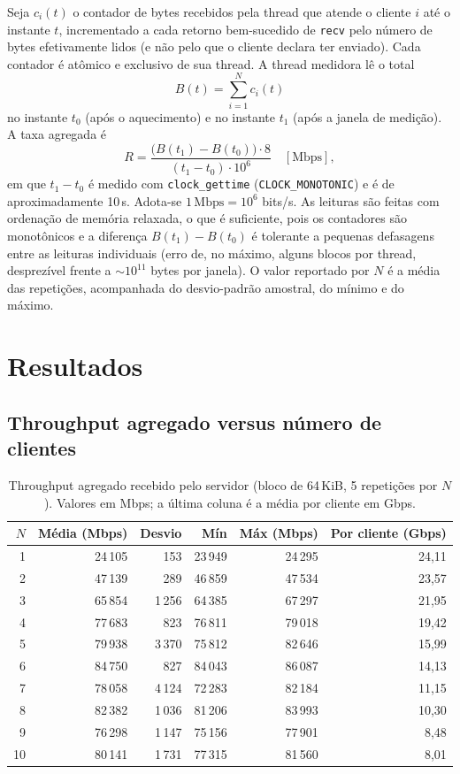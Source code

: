 \documentclass[12pt,a4paper]{article}
\newcommand{\SI}[2]{\mbox{#1\,#2}}
\begin{document}
Seja $c_i(t)$ o contador de bytes recebidos pela thread que atende o cliente
$i$ até o instante $t$, incrementado a cada retorno bem-sucedido de
\texttt{recv} pelo número de bytes efetivamente lidos (e não pelo que o cliente
declara ter enviado). Cada contador é atômico e exclusivo de sua thread. A
thread medidora lê o total
\begin{equation}
B(t)=\sum_{i=1}^{N} c_i(t)
\end{equation}
no instante $t_0$ (após o aquecimento) e no instante $t_1$ (após a janela de
medição). A taxa agregada é
\begin{equation}
R=\frac{\bigl(B(t_1)-B(t_0)\bigr)\cdot 8}{(t_1-t_0)\cdot 10^{6}}\quad[\text{Mbps}],
\end{equation}
em que $t_1-t_0$ é medido com \texttt{clock\_gettime}
(\texttt{CLOCK\_MONOTONIC}) e é de aproximadamente \SI{10}{s}. Adota-se
$1\,\text{Mbps}=10^{6}$ bits/s. As leituras são feitas com ordenação de
memória relaxada, o que é suficiente, pois os contadores são monotônicos e a
diferença $B(t_1)-B(t_0)$ é tolerante a pequenas defasagens entre as leituras
individuais (erro de, no máximo, alguns blocos por thread, desprezível frente
a $\sim\!10^{11}$ bytes por janela). O valor reportado por $N$ é a média das
repetições, acompanhada do desvio-padrão amostral, do mínimo e do máximo.

\section{Resultados}

\subsection{Throughput agregado versus número de clientes}

\begin{table}[H]
\centering
\caption{Throughput agregado recebido pelo servidor (bloco de \SI{64}{KiB},
5 repetições por $N$). Valores em Mbps; a última coluna é a média por cliente
em Gbps.}
\label{tab:main}
\begin{tabular}{rrrrrr}
\toprule
$N$ & Média (Mbps) & Desvio & Mín & \textbf{Máx (Mbps)} & Por cliente (Gbps)\\
\midrule
1  & 24\,105 & 153   & 23\,949 & 24\,295 & 24,11\\
2  & 47\,139 & 289   & 46\,859 & 47\,534 & 23,57\\
3  & 65\,854 & 1\,256 & 64\,385 & 67\,297 & 21,95\\
4  & 77\,683 & 823   & 76\,811 & 79\,018 & 19,42\\
5  & 79\,938 & 3\,370 & 75\,812 & 82\,646 & 15,99\\
6  & 84\,750 & 827   & 84\,043 & 86\,087 & 14,13\\
7  & 78\,058 & 4\,124 & 72\,283 & 82\,184 & 11,15\\
8  & 82\,382 & 1\,036 & 81\,206 & 83\,993 & 10,30\\
9  & 76\,298 & 1\,147 & 75\,156 & 77\,901 & 8,48\\
10 & 80\,141 & 1\,731 & 77\,315 & 81\,560 & 8,01\\
\bottomrule
\end{tabular}
\end{table}
\end{document}
